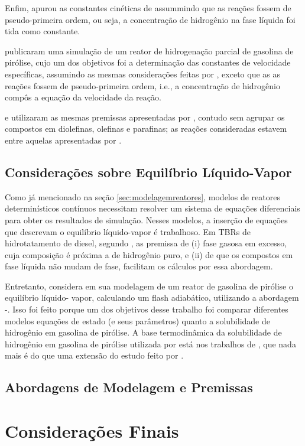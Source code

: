 Enfim, 	apurou as constantes cinéticas de assummindo que as reações fossem de pseudo-primeira ordem, ou seja, a concentração de hidrogênio na fase líquida foi tida como constante.

 publicaram uma simulação de um reator de hidrogenação parcial de gasolina de pirólise, cujo um dos objetivos foi a determinação das constantes de velocidade específicas, assumindo as mesmas considerações feitas por , exceto que as as reações fossem de pseudo-primeira ordem, i.e., a concentração de hidrogênio compôs a equação da velocidade da reação.

 e  utilizaram as mesmas premissas apresentadas por , contudo sem agrupar os compostos em diolefinas, olefinas e parafinas; as reações consideradas estavem entre aquelas apresentadas por . 

\subsection{Considerações sobre Equilíbrio Líquido-Vapor} \label{sec:consideracoeselv}

Como já mencionado na seção \autoref{sec:modelagemreatores}, modelos de reatores determinísticos contínuos necessitam resolver um sistema de equações diferenciais para obter os resultados de simulação. Nesses modelos, a inserção de equações que descrevam o equilíbrio líquido-vapor é trabalhoso. Em TBRs de hidrotatamento de diesel, segundo , as premissa de (i) fase gasosa em excesso, cuja composição é próxima a de hidrogênio puro, e (ii) de que os compostos em fase líquida não mudam de fase, facilitam os cálculos por essa abordagem.

Entretanto,  considera em sua modelagem de um reator de gasolina de pirólise o equilíbrio líquido- vapor, calculando um flash adiabático, utilizando a abordagem \phi-\phi. Isso foi feito porque um dos objetivos desse trabalho foi comparar diferentes modelos equações de estado (e seus parâmetros) quanto a solubilidade de hidrogênio em gasolina de pirólise. A base termodinâmica da solubilidade de hidrogênio em gasolina de pirólise  utilizada por  está nos trabalhos de , que nada mais é do que uma extensão do estudo feito por . 

\subsection{Abordagens de Modelagem e Premissas} \label{sec:abordagenspremissas}



\section{Considerações Finais} \label{sec:consideracoesfinais}


